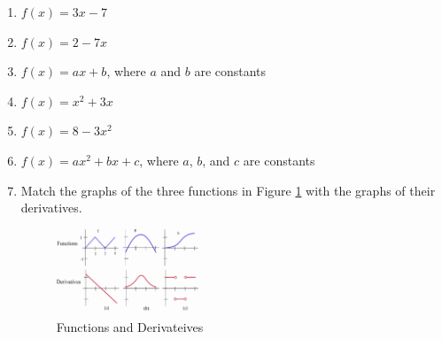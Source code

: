     \begin{enumerate}
    \item $f(x) = 3x - 7$	
    \label{2-5-prob1}
    \item $f(x) = 2 - 7x$	
    \item $f(x) = ax + b$, where  $a$  and  $b$  are constants
    \item $f(x) =  x^2  + 3x$	
    \item $f(x) =  8 - 3x^2$  	
    \item $f(x) = ax^2 + bx + c$,  where $a$, $b$, and $c$ are constants
    \label{2-5-prob6}
    \item Match the graphs of the three functions in Figure \ref{fig:2-5-prob7} with the graphs of their derivatives.
    \begin{figure}[!ht]
  \centering
    \includegraphics[width=0.4\textwidth]{img/chap2/image032.png}
    \caption{Functions and Derivateives}
    \label{fig:2-5-prob7}
\end{figure}
    \end{enumerate}


